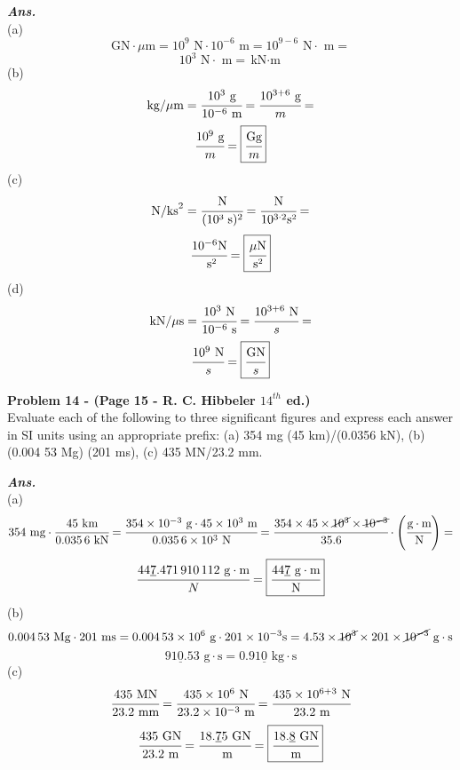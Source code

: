 \documentclass[letterpaper, 11pt]{article}
\newenvironment{problem}[2][Problem]
    { \begin{mdframed} \textbf{#1 #2} \\}
    {  \end{mdframed}}
\newenvironment{solution}
    {\textbf{\textit{Ans.}}\\}
    { }
\begin{document}
\begin{solution}
(a)
\[\text{GN} \cdot \mu \text{m}=10^9\text{ N}\cdot 10^{-6} \text{ m}=10^{9-6}\text{ N}\cdot \text{ m}=\]
\[10^3\text{ N}\cdot \text{ m}=\boxed{\text{kN}\cdot \text{m}}\]
(b)
\[\text{kg}/\mu \text{m}=\cfrac{10^3\text{ g}}{10^{-6}\text{ m}}=\cfrac{10^{3+6}\text{ g}}{m}=\]
\[\cfrac{10^9\text{ g}}{m}=\boxed{\cfrac{\text{Gg}}{m}}\]
(c)
\[\text{N/ks}^2=\cfrac{\text{N}}{(\text{10³ s})^2}=\cfrac{\text{N}}{10^{3\cdot 2}\text{s²}}=\]
\[\cfrac{10^{-6}\text{N}}{\text{ s²}}=\boxed{\cfrac{\mu\text{N}}{\text{s²}}}\]
(d)
\[\text{kN}/\mu \text{s}=\cfrac{10^3 \text{ N}}{10^{-6}\text{ s}}=\cfrac{10^{3+6}\text{ N}}{s}=\]
\[\cfrac{10^9 \text{ N}}{s}=\boxed{\cfrac{\text{GN}}{s}}\]
\end{solution}
\begin{problem}{14 - (Page 15 - R. C. Hibbeler $14^{th}$ ed.)}
    Evaluate each of the following to three significant
    figures and express each answer in SI units using an
    appropriate prefix: (a) 354 mg (45 km)/(0.0356 kN),
    (b) (0.004 53 Mg) (201 ms), (c) 435 MN/23.2 mm.
\end{problem}
\begin{solution}
    (a)
    \[354 \text{ mg}\cdot \cfrac{45 \text{ km}}{0.035\,6 \text{ kN}}=\cfrac{354 \times 10^{-3} \text{ g}\cdot 45\times 10^3\text{ m}}{0.035\, 6 \times 10^3 \text{ N}}=\cfrac{354 \times 45 \times \cancel{10^3}\times \cancel{10^{-3}}}{35.6}\cdot\left(\cfrac{\text{g}\cdot \text{m}}{\text{N}}\right)=\]
    \[\cfrac{44\underline{7}.471\,910\,112\text{ g}\cdot \text{m}}{N}=\boxed{\cfrac{44\underline{7}\text{ g}\cdot \text{m}}{\text{N}}}\]
    (b)
    \[0.004\,53 \text{ Mg}\cdot 201 \text{ ms}=0.004\, 53 \times 10^6 \text{ g} \cdot 201 \times 10^{-3} \text{s}=4.53\times \cancel{10^3} \times 201 \times \cancel{10^{-3}}\text{ g}\cdot \text{s}\]
    \[91\underline{0}.53\text{ g}\cdot \text{s}=\boxed{0.91\underline{0} \text{ kg}\cdot \text{s}}\]
    (c)
    \[\cfrac{435 \text{ MN}}{23.2 \text{ mm}}=\cfrac{435 \times 10^6 \text{ N}}{23.2 \times 10^{-3}\text{ m}}=\cfrac{435 \times 10^{6+3}\text{ N}}{23.2 \text{ m}}\]
    \[\cfrac{435 \text{ GN}}{23.2 \text{ m}}=\cfrac{18.\underline{7}5\text{ GN}}{\text{ m}}=\boxed{\cfrac{18.\underline{8} \text{ GN}}{\text{m}}} \]
\end{solution}
\end{document}
